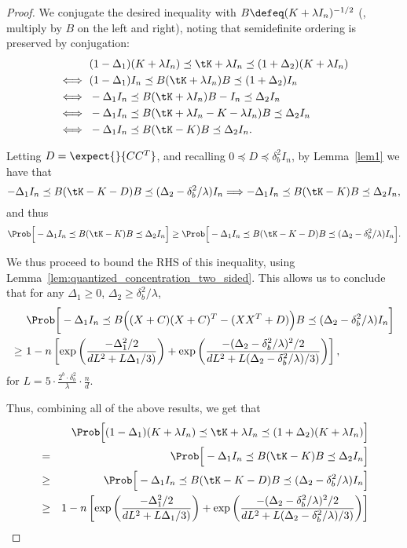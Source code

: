 \begin{proof}
We conjugate the desired inequality with $B \defeq (K + \lambda I_n)^{-1/2}$ (\ie, 
multiply by $B$ on the left and right), noting that semidefinite ordering is
preserved by conjugation:
\begin{align*}
&(1 - \Delta_1) (K + \lambda I_n) \preceq \tK + \lambda I_n \preceq (1 + \Delta_2) (K + \lambda I_n) \\
\iff\ &(1 - \Delta_1) I_n \preceq B (\tK + \lambda I_n) B \preceq (1 + \Delta_2) I_n \\
\iff\ &-\Delta_1 I_n \preceq B (\tK + \lambda I_n) B - I_n \preceq \Delta_2 I_n \\
\iff\ &-\Delta_1 I_n \preceq B (\tK + \lambda I_n - K - \lambda I_n) B \preceq \Delta_2 I_n \\
\iff\ &-\Delta_1 I_n \preceq B (\tK - K) B \preceq \Delta_2 I_n.
\end{align*}

Letting $D=\expect{}{CC^T}$, and recalling  $0 \preceq D \preceq \delta_b^2 I_n$, 
by Lemma~\ref{lem1} we have that 
$$-\Delta_1 I_n \preceq B (\tK - K - D) B \preceq
(\Delta_2 - \delta^2_b/\lambda) I_n 
\Longrightarrow -\Delta_1 I_n \preceq B (\tK - K) B \preceq
\Delta_2 I_n,$$
and thus
$$\Prob\Big[ -\Delta_1 I_n \preceq B (\tK - K) B \preceq
\Delta_2 I_n \Big] \geq  \Prob\Big[ -\Delta_1 I_n \preceq B (\tK - K - D) B \preceq
(\Delta_2 - \delta^2_b/\lambda) I_n \Big].$$
	
We thus proceed to bound the RHS of this inequality, using 
Lemma~\ref{lem:quantized_concentration_two_sided}.
This allows us to conclude that for any $\Delta_1 \geq 0$, $\Delta_2 \geq \delta_b^2/\lambda$,
\begin{align*}
&\Prob\bigg[- \Delta_1 I_n \preceq B\Big((X + C)(X + C)^T - (XX^T+D)\Big)B \preceq (\Delta_2 - \delta^2_b/\lambda) I_n\bigg] \\
\geq\ &1 - n \left[ \exp \left( \frac{-\Delta_1^2/2}{dL^2 +
	L\Delta_1/3)} \right) + \exp \left(\frac{-(\Delta_2 - \delta^2_b/\lambda)^2/2}{dL^2 + L(\Delta_2 - \delta^2_b/\lambda)/3)} \right)  \right],
\end{align*}
for $L = 5 \cdot \frac{2^b \cdot \delta_b^2}{\lambda}\cdot  \frac{n}{d}$.

Thus, combining all of the above results, we get that
\begin{eqnarray*}
&&\Prob\Big[(1 - \Delta_1) (K + \lambda I_n) \preceq \tK + \lambda I_n \preceq (1 + \Delta_2) (K + \lambda I_n)
\Big] \\
&=& \Prob\Big[ -\Delta_1 I_n \preceq B (\tK - K) B \preceq
\Delta_2 I_n \Big] \\
&\geq& \Prob\Big[ -\Delta_1 I_n \preceq B (\tK - K - D) B \preceq
(\Delta_2 - \delta^2_b/\lambda) I_n \Big]\\
&\geq& 1 - n \left[ \exp \left( \frac{-\Delta_1^2/2}{dL^2 +
	L\Delta_1/3)} \right) + \exp \left(\frac{-(\Delta_2 - \delta^2_b/\lambda)^2/2}{dL^2 + L(\Delta_2 - \delta^2_b/\lambda)/3)} \right)  \right]
\end{eqnarray*}
\end{proof}


